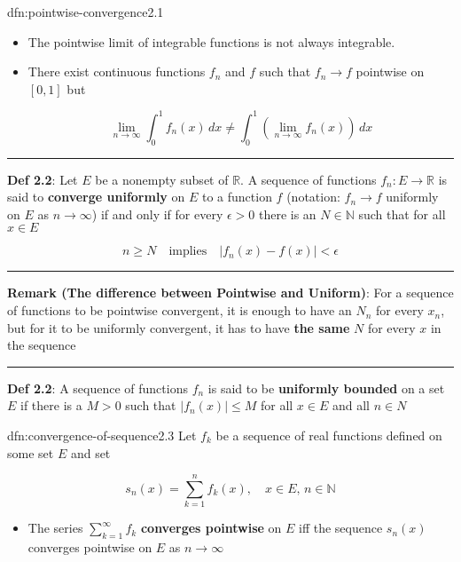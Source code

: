 \documentclass[landscape, 8pt]{extarticle}
\begin{document}
\begin{multicols}{3}
\begin{dfn}{dfn:pointwise-convergence}{2.1}
\begin{itemize}[leftmargin=*]
		\item The pointwise limit of integrable functions is not always integrable.

		\item There exist continuous functions $f_{n}$ and $f$ such that $f_{n}\to f$ pointwise on $[0,1]$ but

			\vspace{-5pt}
			\[\lim_{n \to \infty} \int_{0}^{1} f_{n}(x) \, dx \ne \int_{0}^{1} \left(\lim_{n \to \infty} f_{n}(x)\right) \, dx \]
	\end{itemize}

	\noindent\rule{\textwidth}{0.6pt}

	\textbf{Def 2.2}: Let $E$ be a nonempty subset of $\mathbb{R}$. A sequence of functions $f_{n}: E\to\mathbb{R}$ is said to \textbf{converge uniformly} on $E$ to a function $f$ (notation: $f_{n}\to f$ uniformly on $E$ as $n\to\infty$) if and only if for every $\epsilon>0$ there is an $N \in\mathbb{N}$ such that for all $x \in E$

	\vspace{-8pt}
	\[n\ge N\quad\text{implies}\quad \lvert f_{n}(x)-f(x) \rvert <\epsilon\]

	\vspace{-5pt}
	\noindent\rule{\textwidth}{0.2pt}
	\textbf{Remark (The difference between Pointwise and Uniform)}: For a sequence of functions to be pointwise convergent, it is enough to have an $N_{n}$ for every $x_{n}$, but for it to be uniformly convergent, it has to have \textbf{the same} $N$ for every $x$ in the sequence

	\noindent\rule{\textwidth}{0.2pt}

	\textbf{Def 2.2}: A sequence of functions $f_{n}$ is said to be \textbf{uniformly bounded} on a set $E$ if there is a $M>0$ such that $\lvert f_{n}(x) \rvert\le M$ for all $x\in E$ and all $n\in N$
\end{dfn}

\vspace{-5pt}
\begin{dfn}{dfn:convergence-of-sequence}{2.3}
	\vspace{-5pt}
	Let $f_{k}$ be a sequence of real functions defined on some set $E$ and set

	\vspace{-5pt}
	\[s_{n}(x)=\sum_{k=1}^{n} f_{k}(x),\quad x\in E,\,n\in \mathbb{N}\]
	\begin{itemize}
		\setlength\itemsep{0em}
		\item The series $\sum_{k=1}^{\infty} f_{k}$ \textbf{converges pointwise} on $E$ iff the sequence $s_{n}(x)$ converges pointwise on $E$ as $n\to\infty$


\end{itemize}
\end{dfn}
\end{multicols}
\end{document}
